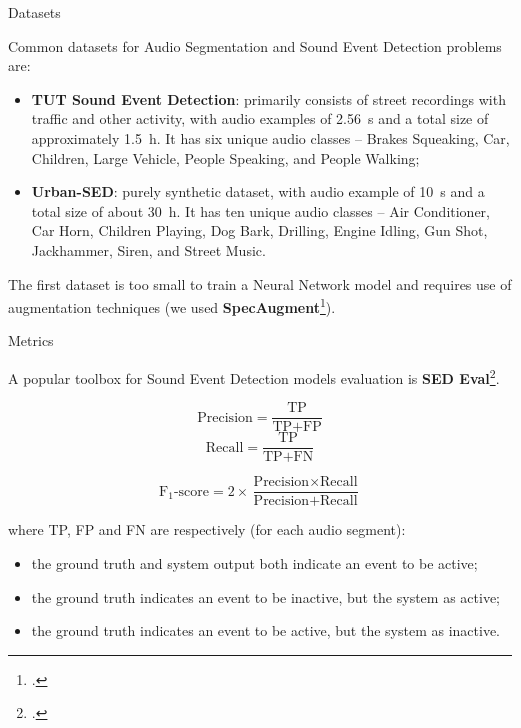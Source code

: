 	\begin{frame}{Datasets}
	
		Common datasets for Audio Segmentation and Sound Event Detection problems are:
		
		\begin{itemize}
			\item \textbf{TUT Sound Event Detection}: primarily consists of street recordings with traffic and other activity, with audio examples of \SI{2.56}{\second} and a total size of approximately \SI{1.5}{\hour}. It has six unique audio classes -- Brakes Squeaking, Car, Children, Large Vehicle, People Speaking, and People Walking;
			\item \textbf{Urban-SED}: purely synthetic dataset, with audio example of \SI{10}{\second} and a total size of about \SI{30}{\hour}. It has ten unique audio classes -- Air Conditioner, Car Horn, Children Playing, Dog Bark, Drilling, Engine Idling, Gun Shot, Jackhammer, Siren, and Street Music.
		\end{itemize}
		
		The first dataset is too small to train a Neural Network model and requires use of augmentation techniques (we used \textbf{SpecAugment}\footcite{park19e_interspeech}).

	\end{frame}
	
	\begin{frame}{Metrics}
	
		A popular toolbox for Sound Event Detection models evaluation is \textbf{SED Eval}\footcite{app6060162}.\vspace{-3em}
		\begin{multicols}{2}
  			\begin{equation*}
    			\text{Precision} = \frac{\text{TP}}{\text{TP} + \text{FP}}
  			\end{equation*}\break
  			\begin{equation*}
    			\text{Recall} = \frac{\text{TP}}{\text{TP} + \text{FN}}
  			\end{equation*}
		\end{multicols}
		\vspace{-1em}
		\begin{equation*}
			\text{F$_{1}$-score} = 2 \times \frac{\text{Precision} \times \text{Recall}}{\text{Precision} + \text{Recall}}
		\end{equation*}
		
		where TP, FP and FN are respectively (for each audio segment):
		\begin{itemize}
			\item the ground truth and system output both indicate an event to be active;
			\item the ground truth indicates an event to be inactive, but the system as active;
			\item the ground truth indicates an event to be active, but the system as inactive.
		\end{itemize}
		
	\end{frame}